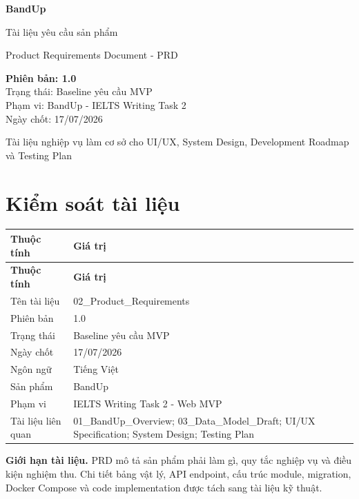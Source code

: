 \documentclass[11pt,a4paper]{article}
\begin{document}
\begin{titlepage}
\centering
\vspace*{2.5cm}
{\sffamily\fontsize{34}{40}\selectfont\bfseries\color{BandBlue} BandUp\par}
\vspace{0.55cm}
{\sffamily\fontsize{22}{28}\selectfont Tài liệu yêu cầu sản phẩm\par}
\vspace{0.25cm}
{\sffamily\large Product Requirements Document - PRD\par}
\vfill
\begin{tcolorbox}[colback=BandLight,colframe=BandBlue,width=0.78\textwidth,boxrule=0.7pt,arc=2mm]
\centering\sffamily
\textbf{Phiên bản: 1.0}\\[1mm]
Trạng thái: Baseline yêu cầu MVP\\[1mm]
Phạm vi: BandUp - IELTS Writing Task 2\\[1mm]
Ngày chốt: 17/07/2026
\end{tcolorbox}
\vspace{1.2cm}
{\sffamily\small Tài liệu nghiệp vụ làm cơ sở cho UI/UX, System Design, Development Roadmap và Testing Plan\par}
\vspace*{1cm}
\end{titlepage}
\section*{Kiểm soát tài liệu}
\small
\setlength{\tabcolsep}{4pt}
\renewcommand{\arraystretch}{1.18}
\begin{longtable}{|P{0.28\textwidth}|P{0.64\textwidth}|}
\hline
\textbf{Thuộc tính} & \textbf{Giá trị} \\ \hline
\endfirsthead
\hline
\textbf{Thuộc tính} & \textbf{Giá trị} \\ \hline
\endhead
Tên tài liệu & 02\_\allowbreak{}Product\_\allowbreak{}Requirements \\ \hline
Phiên bản & 1.0 \\ \hline
Trạng thái & Baseline yêu cầu MVP \\ \hline
Ngày chốt & 17/\allowbreak{}07/\allowbreak{}2026 \\ \hline
Ngôn ngữ & Tiếng Việt \\ \hline
Sản phẩm & BandUp \\ \hline
Phạm vi & IELTS Writing Task 2 - Web MVP \\ \hline
Tài liệu liên quan & 01\_\allowbreak{}BandUp\_\allowbreak{}Overview; 03\_\allowbreak{}Data\_\allowbreak{}Model\_\allowbreak{}Draft; UI/\allowbreak{}UX Specification; System Design; Testing Plan \\ \hline
\end{longtable}
\normalsize
\begin{importantbox}
\textbf{Giới hạn tài liệu.} PRD mô tả sản phẩm phải làm gì, quy tắc nghiệp vụ và điều kiện nghiệm thu. Chi tiết bảng vật lý, API endpoint, cấu trúc module, migration, Docker Compose và code implementation được tách sang tài liệu kỹ thuật.
\end{importantbox}
\tableofcontents
\clearpage
\end{document}
